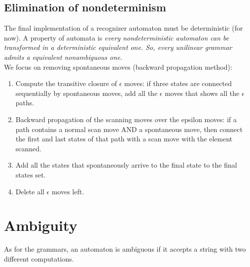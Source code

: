 \documentclass[10pt,a4paper]{article}
\begin{document}
			\subsection{Elimination of nondeterminism}
				The final implementation of a recognizer automaton must be deterministic (for now). A property of automata is \emph{every nondeterministic automaton can be transformed in a deterministic equivalent one. So, every unilinear grammar admits a equivalent nonambiguous one.}\\
				We focus on removing spontaneous moves (backward propagation method):
				\begin{enumerate}
					\item Compute the transitive closure of $\epsilon$ moves: if three states are connected sequentially by spontaneous moves, add all the $\epsilon$ moves that shows all the $\epsilon$ paths.
					\item Backward propagation of the scanning moves over the epsilon moves: if a path contains a normal scan move AND a spontaneous move, then connect the first and last states of that path with a scan move with the element scanned.
					\item Add all the states that spontaneously arrive to the final state to the final states set.
					\item Delete all $\epsilon$ moves left.
				\end{enumerate}
			
		\section{Ambiguity}
			As for the grammars, an automaton is ambiguous if it accepts a string with two different computations. 
		
\end{document}
